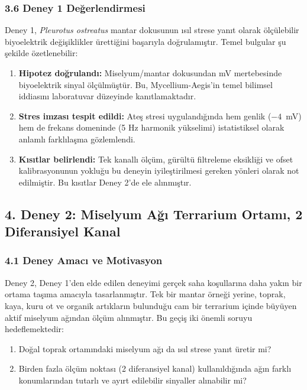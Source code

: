 \documentclass[11pt,a4paper]{article}
\begin{document}
\subsubsection*{3.6 Deney 1 Değerlendirmesi}

Deney 1, \textit{Pleurotus ostreatus} mantar dokusunun ısıl strese yanıt olarak ölçülebilir biyoelektrik değişiklikler ürettiğini başarıyla doğrulamıştır. Temel bulgular şu şekilde özetlenebilir:
\begin{enumerate}[leftmargin=1.2cm]
  \item \textbf{Hipotez doğrulandı:} Miselyum/mantar dokusundan mV mertebesinde biyoelektrik sinyal ölçülmüştür. Bu, Mycellium-Aegis'in temel bilimsel iddiasını laboratuvar düzeyinde kanıtlamaktadır.
  \item \textbf{Stres imzası tespit edildi:} Ateş stresi uygulandığında hem genlik ($-4$~mV) hem de frekans domeninde (5 Hz harmonik yükselimi) istatistiksel olarak anlamlı farklılaşma gözlemlendi.
  \item \textbf{Kısıtlar belirlendi:} Tek kanallı ölçüm, gürültü filtreleme eksikliği ve ofset kalibrasyonunun yokluğu bu deneyin iyileştirilmesi gereken yönleri olarak not edilmiştir. Bu kısıtlar Deney 2'de ele alınmıştır.
\end{enumerate}

\subsection*{4. Deney 2: Miselyum Ağı Terrarium Ortamı, 2 Diferansiyel Kanal}

\subsubsection*{4.1 Deney Amacı ve Motivasyon}

Deney 2, Deney 1'den elde edilen deneyimi gerçek saha koşullarına daha yakın bir ortama taşıma amacıyla tasarlanmıştır. Tek bir mantar örneği yerine, toprak, kaya, kuru ot ve organik artıkların bulunduğu cam bir terrarium içinde büyüyen aktif miselyum ağından ölçüm alınmıştır. Bu geçiş iki önemli soruyu hedeflemektedir:
\begin{enumerate}[leftmargin=1.2cm]
  \item Doğal toprak ortamındaki miselyum ağı da ısıl strese yanıt üretir mi?
  \item Birden fazla ölçüm noktası (2 diferansiyel kanal) kullanıldığında ağın farklı konumlarından tutarlı ve ayırt edilebilir sinyaller alınabilir mi?
\end{enumerate}
\end{document}

